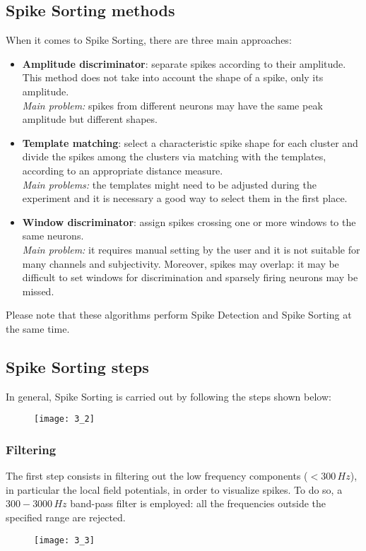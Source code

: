 \subsection{Spike Sorting methods}
When it comes to Spike Sorting, there are three main approaches:
\begin{itemize}
    \item \textbf{Amplitude discriminator}: separate spikes according to their amplitude.
          This method does not take into account the shape of a spike, only its amplitude.\\
          \textit{Main problem:} spikes from different neurons may have the same peak
          amplitude but different shapes.
    \item \textbf{Template matching}: select a characteristic spike shape for each
          cluster and divide the spikes among the clusters via matching with the templates,
          according to an appropriate distance measure.\\
          \textit{Main problems:} the templates might need to be adjusted during the
          experiment and it is necessary a good way to select them in the first place.
    \item \textbf{Window discriminator}: assign spikes crossing one or more windows to
          the same neurons.\\
          \textit{Main problem:} it requires manual setting by the user and it is not
          suitable for many channels and subjectivity. Moreover, spikes may overlap: it may
          be difficult to set windows for discrimination and sparsely firing neurons may be
          missed.
\end{itemize}
Please note that these algorithms perform Spike Detection and Spike Sorting at the same
time.\\
\subsection{Spike Sorting steps}
In general, Spike Sorting is carried out by following the steps shown below:
\begin{figure}[H]
    \texttt{[image: 3\_2]}
    \centering
\end{figure}
\subsubsection{Filtering}
The first step consists in filtering out the low frequency components (\(< 300 \,Hz\)),
in particular the local field potentials, in order to visualize spikes. To do so, a
\(300-3000 \,Hz\) band-pass filter is employed: all the frequencies outside the
specified range are rejected.
\begin{figure}[H]
    \texttt{[image: 3\_3]}
    \centering
\end{figure}
